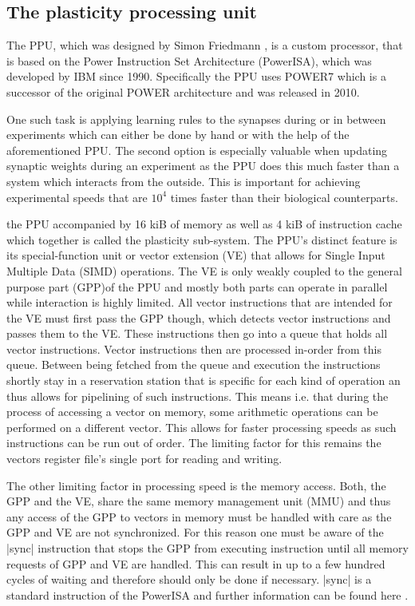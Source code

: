 
\subsection{The plasticity processing unit}

The PPU, which was designed by Simon Friedmann , is a custom processor, that is based on the Power Instruction Set Architecture (PowerISA), which was developed by IBM since 1990. 
Specifically the PPU uses POWER7 which is a successor of the original POWER architecture and was released in 2010.

One such task is applying learning rules to the synapses during or in between experiments which can either be done by hand or with the help of the aforementioned PPU.
The second option is especially valuable when updating synaptic weights during an experiment as the PPU does this much faster than a system which interacts from the outside.
This is important for achieving experimental speeds that are $10^{4}$ times faster than their biological counterparts.

the PPU accompanied by 16 kiB of memory as well as 4 kiB of instruction cache which together is called the plasticity sub-system.
The PPU's distinct feature is its special-function unit or vector extension (VE) that allows for Single Input Multiple Data (SIMD) operations.
The VE is only weakly coupled to the general purpose part (GPP)of the PPU and mostly both parts can operate in parallel while interaction is highly limited.
All vector instructions that are intended for the VE must first pass the GPP though, which detects vector instructions and passes them to the VE.
These instructions then go into a queue that holds all vector instructions.
Vector instructions then are processed in-order from this queue.
Between being fetched from the queue and execution the instructions shortly stay in a reservation station that is specific for each kind of operation an thus allows for pipelining of such instructions.
This means i.e. that during the process of accessing a vector on memory, some arithmetic operations can be performed on a different vector.
This allows for faster processing speeds as such instructions can be run out of order.
The limiting factor for this remains the vectors register file's single port for reading and writing.

The other limiting factor in processing speed is the memory access.
Both, the GPP and the VE, share the same memory management unit (MMU) and thus any access of the GPP to vectors in memory must be handled with care as the GPP and VE are not synchronized.
For this reason one must be aware of the |sync| instruction that stops the GPP from executing instruction until all memory requests of GPP and VE are handled.
This can result in up to a few hundred cycles of waiting and therefore should only be done if necessary.
|sync| is a standard instruction of the PowerISA and further information can be found here .



